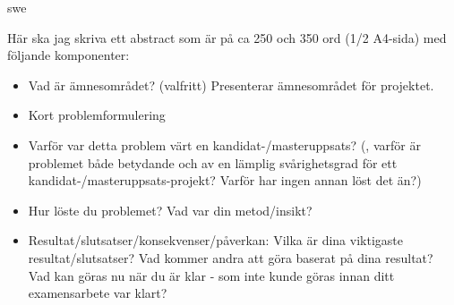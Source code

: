 \markboth{\abstractname}{}
\begin{scontents}[store-env=lang]
swe
\end{scontents}
\begin{scontents}[store-env=abstracts,print-env=true]
Här ska jag skriva ett abstract som är på ca 250 och 350 ord (1/2 A4-sida) med följande komponenter:
\begin{itemize}
    \item Vad är ämnesområdet? (valfritt) Presenterar ämnesområdet för projektet.
    \item Kort problemformulering
    \item Varför var detta problem värt en kandidat-/masteruppsats? (\ie, varför är problemet både betydande och av en lämplig svårighetsgrad för ett kandidat-/masteruppsats-projekt? Varför har ingen annan löst det än?)
    \item Hur löste du problemet? Vad var din metod/insikt?
    \item Resultat/slutsatser/konsekvenser/påverkan: Vilka är dina viktigaste resultat/\linebreak[4]slutsatser? Vad kommer andra att göra baserat på dina resultat? Vad kan göras nu när du är klar - som inte kunde göras innan ditt examensarbete var klart?
\end{itemize}


\end{scontents}
